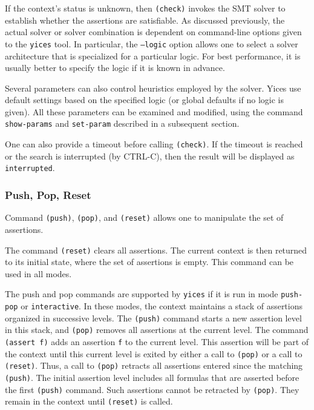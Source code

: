 \documentclass[11pt,twoside,fleqn,openright,titlepage]{cslreport}
\begin{document}
\medskip\noindent
If the context's status is unknown, then \texttt{(check)} invokes the
SMT solver to establish whether the assertions are satisfiable. As
discussed previously, the actual solver or solver combination is
dependent on command-line options given to the \texttt{yices} tool. In
particular, the \texttt{--logic} option allows one to select a solver
architecture that is specialized for a particular logic. For best
performance, it is usually better to specify the logic if it is known
in advance.

\medskip\noindent Several parameters can also control heuristics
employed by the solver. Yices use default settings based on the
specified logic (or global defaults if no logic is given). All these
parameters can be examined and modified, using the command
\texttt{show-params} and \texttt{set-param} described in a subsequent
section.

\medskip\noindent One can also provide a timeout before calling
\texttt{(check)}. If the timeout is reached or the search is
interrupted (by CTRL-C), then the result will be displayed as
\texttt{interrupted}.


\subsubsection*{Push, Pop, Reset}

Command \texttt{(push)}, \texttt{(pop)}, and \texttt{(reset)} allows
one to manipulate the set of assertions.

\medskip\noindent
The command \texttt{(reset)} clears all assertions. The current
context is then returned to its initial state, where the set of
assertions is empty. This command can be used in all modes.

\medskip\noindent
The push and pop commands are supported by \texttt{yices} if it is run
in mode \texttt{push-pop} or \texttt{interactive}. In these modes, the
context maintains a stack of assertions organized in successive
levels. The \texttt{(push)} command starts a new assertion level in
this stack, and \texttt{(pop)} removes all assertions at the current
level. The command \texttt{(assert f)} adds an assertion \texttt{f} to
the current level. This assertion will be part of the context until
this current level is exited by either a call to \texttt{(pop)} or a
call to \texttt{(reset)}. Thus, a call to \texttt{(pop)} retracts all
assertions entered since the matching \texttt{(push)}.  The initial
assertion level includes all formulas that are asserted before the
first \texttt{(push)} command. Such assertions cannot be retracted by
\texttt{(pop)}. They remain in the context until \texttt{(reset)} is
called.
\end{document}
